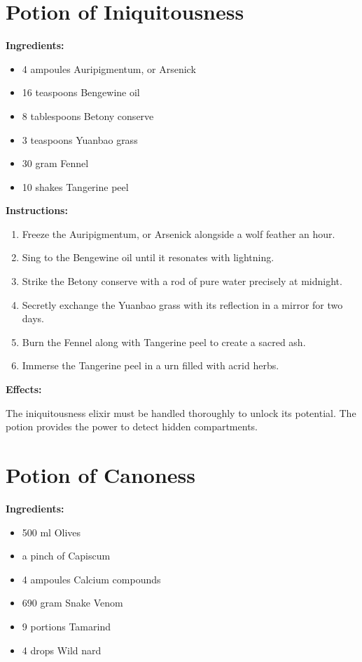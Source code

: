 \documentclass{article}
\begin{document}
\newpage
\section*{Potion of Iniquitousness}

\textbf{Ingredients:}

\begin{itemize}
  \item 4 ampoules Auripigmentum, or Arsenick
  \item 16 teaspoons Bengewine oil
  \item 8 tablespoons Betony conserve
  \item 3 teaspoons Yuanbao grass
  \item 30 gram Fennel
  \item 10 shakes Tangerine peel
\end{itemize}

\textbf{Instructions:}

\begin{enumerate}
  \item Freeze the Auripigmentum, or Arsenick alongside a wolf feather an hour.
  \item Sing to the Bengewine oil until it resonates with lightning.
  \item Strike the Betony conserve with a rod of pure water precisely at midnight.
  \item Secretly exchange the Yuanbao grass with its reflection in a mirror for two days.
  \item Burn the Fennel along with Tangerine peel to create a sacred ash.
  \item Immerse the Tangerine peel in a urn filled with acrid herbs.
\end{enumerate}

\textbf{Effects:}

The iniquitousness elixir must be handled thoroughly to unlock its potential. The potion provides the power to detect hidden compartments.

\newpage
\section*{Potion of Canoness}

\textbf{Ingredients:}

\begin{itemize}
  \item 500 ml Olives
  \item a pinch of Capiscum
  \item 4 ampoules Calcium compounds
  \item 690 gram Snake Venom
  \item 9 portions Tamarind
  \item 4 drops Wild nard
\end{itemize}
\end{document}
